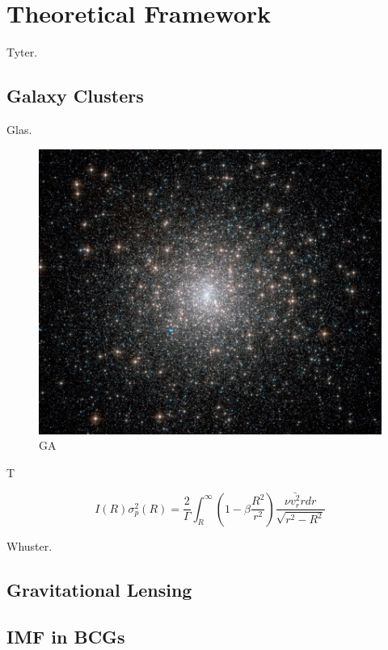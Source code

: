 \chapter{Theoretical Framework}

Tyter. 

\section{Galaxy Clusters}
 
Glas.

\begin{figure}[H]
\centering
\includegraphics[width=12cm]{images/m15.jpg}
\caption[Mr]{GA}
\end{figure}

T 

\begin{equation}
I(R)\sigma_{p}^{2}(R)=\frac{2}{\Gamma}\int_{R}^{\infty}\left(1-\beta\frac{R^{2}}{r^{2}}\right)\frac{\nu\bar{v_{r}^{2}}rdr}{\sqrt{r^{2}-R^{2}}}
\end{equation}

Whuster.  

\section{Gravitational Lensing}

\section{IMF in BCGs}



